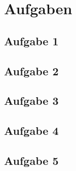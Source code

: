 \documentclass{article}
\begin{document}
\section{Aufgaben}

\subsection{Aufgabe 1}

\vspace{12cm}

\newpage

\subsection{Aufgabe 2}

\vspace{12cm}

\newpage

\subsection{Aufgabe 3}

\vspace{12cm}

\newpage

\subsection{Aufgabe 4}

\vspace{12cm}

\newpage

\subsection{Aufgabe 5}

\vspace{12cm}
\end{document}
